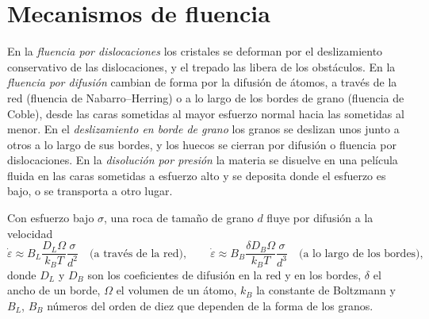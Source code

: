 \section{Mecanismos de fluencia}

\begin{definition}\label{def:b3:deformation-mechanisms:creep}
En la \emph{fluencia por dislocaciones} los cristales se deforman por el
deslizamiento conservativo de las dislocaciones, y el trepado las libera de los obstáculos. En la
\emph{fluencia por difusión} cambian de forma por la
difusión de átomos, a través de la red (fluencia de Nabarro--Herring) o a lo largo de los
bordes de grano (fluencia de Coble), desde las caras sometidas al mayor esfuerzo normal
hacia las sometidas al menor. En el \emph{deslizamiento en borde de grano}
los granos se deslizan unos junto a otros a lo largo de sus bordes, y los huecos se
cierran por difusión o fluencia por dislocaciones. En la \emph{disolución por
presión} la materia se disuelve en una película fluida en las
caras sometidas a esfuerzo alto y se deposita donde el esfuerzo es bajo, o se transporta
a otro lugar.
\end{definition}

\begin{proposition}\label{prop:b3:deformation-mechanisms:grain-size}
Con esfuerzo bajo $\sigma$, una roca de tamaño de grano $d$ fluye por difusión a la velocidad
\[
  \dot\varepsilon \approx B_L\frac{D_L\Omega}{k_BT}\frac{\sigma}{d^2}
  \quad\text{(a través de la red)},\qquad
  \dot\varepsilon \approx B_B\frac{\delta D_B\Omega}{k_BT}\frac{\sigma}{d^3}
  \quad\text{(a lo largo de los bordes)},
\]
donde $D_L$ y $D_B$ son los coeficientes de difusión en la red y en los
bordes, $\delta$ el ancho de un borde, $\Omega$ el volumen de un átomo,
$k_B$ la constante de Boltzmann y $B_L$, $B_B$ números del orden de diez que dependen de
la forma de los granos.
\end{proposition}

